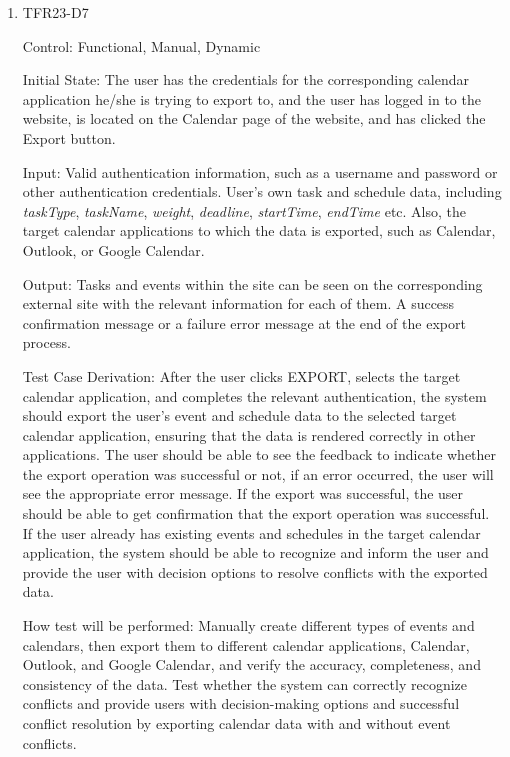 \documentclass[12pt, titlepage]{article}
\begin{document}
\begin{enumerate}
\item{TFR23-D7\\} \label{TFR23-D7}

Control: Functional, Manual, Dynamic
					
Initial State: The user has the credentials for the corresponding calendar application he/she is trying to export to, and the user has logged in to the website, is located on the Calendar page of the website, and has clicked the Export button.
					
Input: Valid authentication information, such as a username and password or other authentication credentials. User's own task and schedule data, including \textit{taskType}, \textit{taskName}, \textit{weight}, \textit{deadline}, \textit{startTime}, \textit{endTime} etc. Also, the target calendar applications to which the data is exported, such as Calendar, Outlook, or Google Calendar.
					
Output: Tasks and events within the site can be seen on the corresponding external site with the relevant information for each of them. A success confirmation message or a failure error message at the end of the export process.

Test Case Derivation: After the user clicks EXPORT, selects the target calendar application, and completes the relevant authentication, the system should export the user's event and schedule data to the selected target calendar application, ensuring that the data is rendered correctly in other applications. The user should be able to see the feedback to indicate whether the export operation was successful or not, if an error occurred, the user will see the appropriate error message. If the export was successful, the user should be able to get confirmation that the export operation was successful. If the user already has existing events and schedules in the target calendar application, the system should be able to recognize and inform the user and provide the user with decision options to resolve conflicts with the exported data.
					
How test will be performed: Manually create different types of events and calendars, then export them to different calendar applications, Calendar, Outlook, and Google Calendar, and verify the accuracy, completeness, and consistency of the data. Test whether the system can correctly recognize conflicts and provide users with decision-making options and successful conflict resolution by exporting calendar data with and without event conflicts. 


\end{enumerate}
\end{document}
